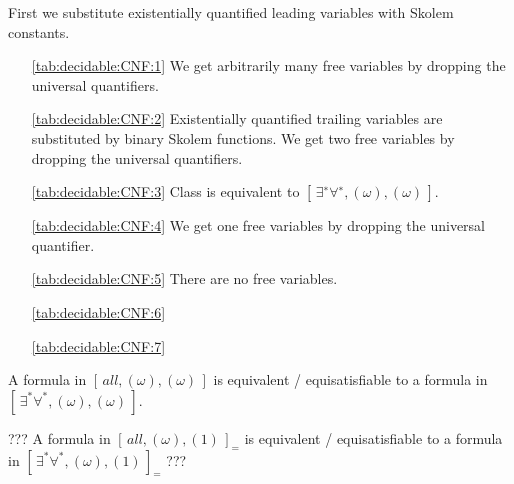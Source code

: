 First we substitute existentially quantified leading variables with Skolem constants.

\begin{itemize}
	\item[\ref{tab:decidable:CNF:1}] We get arbitrarily many free variables by dropping the universal quantifiers.
	\item[\ref{tab:decidable:CNF:2}]
	Existentially quantified trailing variables are substituted by binary Skolem functions.
	We get two free variables by dropping the universal quantifiers.
	\item[\ref{tab:decidable:CNF:3}]
	Class is equivalent to $[\,\exists^{∗}\forall^{∗}, (\omega), (\omega)\,]$.
	\item[\ref{tab:decidable:CNF:4}]
	We get one free variables by dropping the universal quantifier.
	\item[\ref{tab:decidable:CNF:5}]
	There are no free variables.
	\item[\ref{tab:decidable:CNF:6}]
	\item[\ref{tab:decidable:CNF:7}]
\end{itemize}

\begin{lemma}\label{lem:unary}
	A formula in $[\,all, (\omega), (\omega)\,]$ is equivalent / equisatisfiable 
	to a formula in $[\,\exists^*\forall^*, (\omega), (\omega)\,]$.
\end{lemma}

\begin{lemma}\label{lem:unary:equals}
	??? A formula in $[\,all, (\omega), (1)\,]_=$ is equivalent / equisatisfiable 
	to a formula in $[\,\exists^*\forall^*, (\omega), (1)\,]_=$ ???
\end{lemma}

